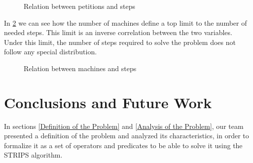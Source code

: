 \documentclass[12pt,a4paper,oneside]{article}
\numberwithin{equation}{section}
\numberwithin{equation}{section}
\theoremstyle{definition}
\begin{document}
\begin{figure}[h!]
	\centering
	\caption{Relation between petitions and steps}
	\label{fig:2d-petitions}
\end{figure}

In \ref{fig:2d-petitions} we can see how the number of machines define a top limit to the number of needed steps. This limit is an inverse correlation between the two variables. Under this limit, the number of steps required to solve the problem does not follow any special distribution.

\begin{figure}[h!]
	\centering
	\caption{Relation between machines and steps}
	\label{fig:2d-petitions}
\end{figure}

\newcommand{\plotthreedee}[2]{
	\begin{axis}[
		scale=0.75,
		view={#2}{#1},
		xlabel=Petitions,
		ylabel=Machines,
		zlabel=Steps,
	]
	\addplot3[
		scatter,
		only marks,
	]
	table[
		x=Petitions,
		y=Machines,
		z=Steps,
		col sep=comma,
	]{results.csv};
	\end{axis}
}




\section{Conclusions and Future Work} \label{Conclusions}

In sections \ref{Definition of the Problem} and \ref{Analysis of the Problem}, our team presented a definition of the problem and analyzed its characteristics, in order to formalize it as a set of operators and predicates to be able to solve it using the STRIPS algorithm.
\end{document}
